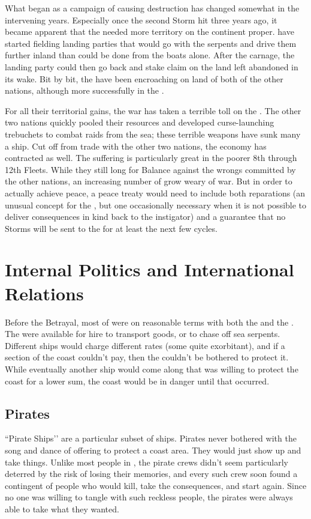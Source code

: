 \documentclass[blue]{GL2020}
\begin{document}
What began as a campaign of causing destruction has changed somewhat in the intervening years. Especially once the second Storm hit three years ago, it became apparent that the \pShip{} needed more territory on the continent proper. \pShippies{} have started fielding landing parties that would go with the serpents and drive them further inland than could be done from the boats alone. After the carnage, the landing party could then go back and stake claim on the land left abandoned in its wake. Bit by bit, the \pShip{} have been encroaching on land of both of the other nations, although more successfully in the \pFarm{}.

For all their territorial gains, the war has taken a terrible toll on the \pShippies{}. The other two nations quickly pooled their resources and developed curse-launching trebuchets to combat raids from the sea; these terrible weapons have sunk many a ship. Cut off from trade with the other two nations, the \pShippies{} economy has contracted as well. The suffering is particularly great in the poorer 8th through 12th Fleets. While they still long for Balance against the wrongs committed by the other nations, an increasing number of \pShippies{} grow weary of war. But in order to actually achieve peace, a peace treaty would need to include both reparations (an unusual concept for the \pShippies{}, but one occasionally necessary when it is not possible to deliver consequences in kind back to the instigator) and a guarantee that no Storms will be sent to the \pShippies{} for at least the next few cycles.

\section*{Internal Politics and International Relations}
Before the Betrayal, most of \pShip{} were on reasonable terms with both the \pFarm{} and the \pTech{}. The \pShippies{} were available for hire to transport goods, or to chase off sea serpents. Different ships would charge different rates (some quite exorbitant), and if a section of the coast couldn't pay, then the \pShip{} couldn't be bothered to protect it. While eventually another ship would come along that was willing to protect the coast for a lower sum, the coast would be in danger until that occurred.

\subsection*{Pirates}
``Pirate Ships'’ are a particular subset of \pShip{} ships. Pirates never bothered with the song and dance of offering to protect a coast area. They would just show up and take things. Unlike most people in \pEarth{}, the pirate crews didn't seem particularly deterred by the risk of losing their memories, and every such crew soon found a contingent of people who would kill, take the consequences, and start again. Since no one was willing to tangle with such reckless people, the pirates were always able to take what they wanted.
\end{document}
